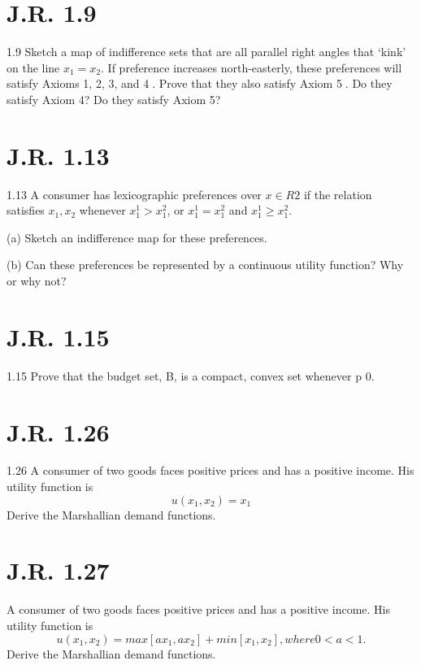 \documentclass{article}
\begin{document}
\section{J.R. 1.9}

1.9 Sketch a map of indifference sets that are all parallel right angles that ‘kink’ on the line $x_1 = x_2$. If
preference increases north-easterly, these preferences will satisfy Axioms 1, 2, 3, and 4. Prove that
they also satisfy Axiom 5. Do they satisfy Axiom 4? Do they satisfy Axiom 5?

\section{J.R. 1.13}
1.13 A consumer has lexicographic preferences over $x ∈ R2$ if the relation  satisfies $x_1, x_2$ whenever
$x_1^1 > x_1^2$, or $x_1^1 = x_1^2$ and $x_1^1 ≥ x_1^2$.

(a) Sketch an indifference map for these preferences.

(b) Can these preferences be represented by a continuous utility function? Why or why not?


\section{J.R. 1.15}
1.15 Prove that the budget set, B, is a compact, convex set whenever p  0.
\section{J.R. 1.26}
1.26 A consumer of two goods faces positive prices and has a positive income. His utility function is
$$u(x_1, x_2) = x_1$$ Derive the Marshallian demand functions.

\section{J.R. 1.27}
A consumer of two goods faces positive prices and has a positive income. His utility function is
$$u(x_1, x_2) = max[ax_1, ax_2] + min[x_1, x_2], where 0 < a < 1.$$
Derive the Marshallian demand functions.
\end{document}
